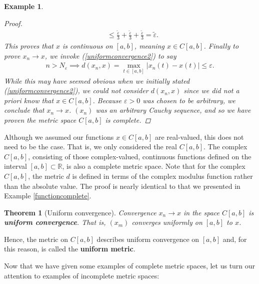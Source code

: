 \documentclass[11pt]{article}
\theoremstyle{mystyle}
\newtheorem{thm}{Theorem}[section]
\newtheorem{protoexamp}{Example}[section]
\newenvironment{examp}
{\colorlet{shadecolor}{orange!15}\begin{shaded}\begin{protoexamp}}
{\end{protoexamp}\end{shaded}}
\newcommand{\0}{\mathbf{0}}
\begin{document}
\begin{examp}
\begin{proof}
\begin{align*}
    &\leq \frac{\tilde{\varepsilon}}{3} + \frac{\tilde{\varepsilon}}{3} + \frac{\tilde{\varepsilon}}{3} = \tilde{\varepsilon}.
\end{align*}
This proves that $x$ is continuous on $[a, b]$, meaning $x \in C[a, b]$.\newline
Finally to prove $x_n \longrightarrow x$, we invoke (\ref{uniformconvergence2}) to say 
\begin{align*}
    n > N_{\varepsilon} \implies d(x_n, x) = \max_{t \in [a, b]} |x_n(t) - x(t)| \leq \varepsilon.
\end{align*}
While this may have seemed obvious when we initially stated (\ref{uniformconvergence2}), we could not consider $d(x_n, x)$ since we did not a priori know that $x \in C[a, b]$. Because $\varepsilon > 0$ was chosen to be arbitrary, we conclude that $x_n \longrightarrow x$.\newline
$(x_n)$ was an arbitrary Cauchy sequence, and so we have proven the metric space $C[a,b]$ is complete.
\end{proof}
\end{examp}

Although we assumed our functions $x \in C[a,b]$ are real-valued, this does not need to be the case. That is, we only considered the real $C[a,b]$. The complex $C[a,b]$, consisting of those complex-valued, continuous functions defined on the interval $[a,b] \subset \mathbb{R}$, is also a complete metric space. Note that for the complex $C[a,b]$, the metric $d$ is defined in terms of the complex modulus function rather than the absolute value. The proof is nearly identical to that we presented in Example \ref{functioncomplete}.

\begin{thm}[Uniform convergence]
Convergence $x_n \longrightarrow x$ in the space $C[a,b]$ is \textbf{uniform convergence}. That is, $(x_m)$ converges uniformly on $[a,b]$ to $x$.
\end{thm}
Hence, the metric on $C[a,b]$ describes uniform convergence on $[a, b]$ and, for this reason, is called the \textbf{uniform metric}.

Now that we have given some examples of complete metric spaces, let us turn our attention to examples of incomplete metric spaces:
\end{document}
